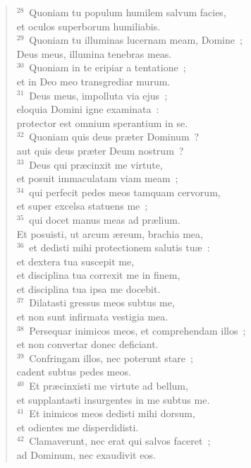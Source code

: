 \begin{verse}
${}^{28}$~Quoniam tu populum humilem salvum facies,\\ et oculos superborum humiliabis.\\
${}^{29}$~Quoniam tu illuminas lucernam meam, Domine~;\\ Deus meus, illumina tenebras meas.\\
${}^{30}$~Quoniam in te eripiar a tentatione~;\\ et in Deo meo transgrediar murum.\\
${}^{31}$~Deus meus, impolluta via ejus~;\\ eloquia Domini igne examinata~:\\ protector est omnium sperantium in se.\\
${}^{32}$~Quoniam quis deus pr\ae ter Dominum~?\\ aut quis deus pr\ae ter Deum nostrum~?\\
${}^{33}$~Deus qui pr\ae cinxit me virtute,\\ et posuit immaculatam viam meam~;\\
${}^{34}$~qui perfecit pedes meos tamquam cervorum,\\ et super excelsa statuens me~;\\
${}^{35}$~qui docet manus meas ad pr\ae lium.\\ Et posuisti, ut arcum \ae reum, brachia mea,\\
${}^{36}$~et dedisti mihi protectionem salutis tu\ae~:\\ et dextera tua suscepit me,\\ et disciplina tua correxit me in finem,\\ et disciplina tua ipsa me docebit.\\
${}^{37}$~Dilatasti gressus meos subtus me,\\ et non sunt infirmata vestigia mea.\\
${}^{38}$~Persequar inimicos meos, et comprehendam illos~;\\ et non convertar donec deficiant.\\
${}^{39}$~Confringam illos, nec poterunt stare~;\\ cadent subtus pedes meos.\\
${}^{40}$~Et pr\ae cinxisti me virtute ad bellum,\\ et supplantasti insurgentes in me subtus me.\\
${}^{41}$~Et inimicos meos dedisti mihi dorsum,\\ et odientes me disperdidisti.\\
${}^{42}$~Clamaverunt, nec erat qui salvos faceret~;\\ ad Dominum, nec exaudivit eos.\\

\end{verse}
